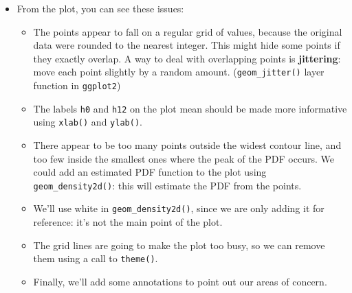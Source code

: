 \documentclass[
  9pt,
  a4paper,
  ignorenonframetext,
  notheorems]{beamer}
\providecommand{\tightlist}{%
  \setlength{\itemsep}{0pt}\setlength{\parskip}{0pt}}\usepackage{longtable,booktabs,array}
\begin{document}
\begin{frame}[fragile]
\begin{itemize}
\tightlist
\item
  From the plot, you can see these issues:

  \begin{itemize}
  \tightlist
  \item
    The points appear to fall on a regular grid of values, because the
    original data were rounded to the nearest integer. This might hide
    some points if they exactly overlap. A way to deal with overlapping
    points is \textbf{jittering}: move each point slightly by a random
    amount. (\texttt{geom\_jitter()} layer function in \texttt{ggplot2})
  \item
    The labels \texttt{h0} and \texttt{h12} on the plot mean should be
    made more informative using \texttt{xlab()} and \texttt{ylab()}.
  \item
    There appear to be too many points outside the widest contour line,
    and too few inside the smallest ones where the peak of the PDF
    occurs. We could add an estimated PDF function to the plot using
    \texttt{geom\_density2d()}: this will estimate the PDF from the
    points.
  \item
    We'll use white in \texttt{geom\_density2d()}, since we are only
    adding it for reference: it's not the main point of the plot.
  \item
    The grid lines are going to make the plot too busy, so we can remove
    them using a call to \texttt{theme()}.
  \item
    Finally, we'll add some annotations to point out our areas of
    concern.
  \end{itemize}
\end{itemize}
\end{frame}
\end{document}
